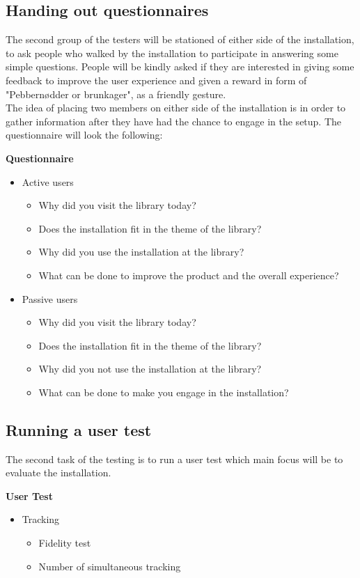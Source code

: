 \subsection{Handing out questionnaires}
The second group of the testers will be stationed of either side of the installation, to ask people who walked by the installation to participate in answering some simple  questions. People will be kindly asked if they are interested in giving some feedback to improve the user experience and given a reward in form of "Pebbernødder or brunkager", as a friendly gesture.\\
The idea of placing two members on either side of the installation is in order to gather information after they have had the chance to engage in the setup. The questionnaire will look the following:

\textbf{Questionnaire}
\begin{itemize}
\item Active users
\begin{itemize}
\item Why did you visit the library today?
\item Does the installation fit in the theme of the library?
\item Why did you use the installation at the library?
\item What can be done to improve the product and the overall experience?
\end{itemize}
\item Passive users
\begin{itemize}
\item Why did you visit the library today?
\item Does the installation fit in the theme of the library?
\item Why did you not use the installation at the library?
\item What can be done to make you engage in the installation?
\end{itemize}
\end{itemize}

\subsection{Running a user test}
The second task of the testing is to run a user test which main focus will be to evaluate the installation. 

\textbf{User Test}
\begin{itemize}
\item Tracking
\begin{itemize}
\item Fidelity test
\item Number of simultaneous tracking
\end{itemize}
\end{itemize}


